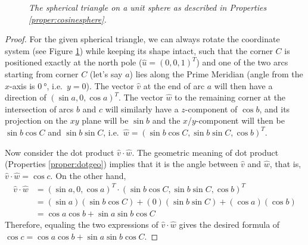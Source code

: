\begin{figure}[ht!]
\caption{\textit{The spherical triangle on a unit sphere as described in Properties \ref{proper:cosinesphere}.}}
\label{fig:cosinesphere}
\end{figure}
\begin{proof}
For the given spherical triangle, we can always rotate the coordinate system (see Figure \ref{fig:cosinesphere}) while keeping its shape intact, such that the corner $C$ is positioned exactly at the north pole ($\hat{u} = (0,0,1)^T$) and one of the two arcs starting from corner $C$ (let's say $a$) lies along the Prime Meridian (angle from the $x$-axis is $\SI{0}{\degree}$, i.e.\ $y = 0$). The vector $\hat{v}$ at the end of arc $a$ will then have a direction of $(\sin a, 0, \cos a)^T$. The vector $\hat{w}$ to the remaining corner at the intersection of arcs $b$ and $c$ will similarly have a $z$-component of $\cos b$, and its projection on the $xy$ plane will be $\sin b$ and the $x$/$y$-component will then be $\sin b \cos C$ and $\sin b \sin C$, i.e.\ $\hat{w} = (\sin b \cos C, \sin b \sin C, \cos b)^T$. \par
Now consider the dot product $\hat{v} \cdot \hat{w}$. The geometric meaning of dot product (Properties \ref{proper:dotgeo}) implies that it is the angle between $\hat{v}$ and $\hat{w}$, that is, $\hat{v} \cdot \hat{w} \allowbreak = \cos c$. On the other hand,
\begin{align*}
\hat{v} \cdot \hat{w} &= (\sin a, 0, \cos a)^T \cdot (\sin b \cos C, \sin b \sin C, \cos b)^T \\
&= (\sin a) (\sin b \cos C) + (0) (\sin b \sin C) + (\cos a) (\cos b) \\
&= \cos a \cos b + \sin a \sin b \cos C 
\end{align*}
Therefore, equaling the two expressions of $\hat{v} \cdot \hat{w}$ gives the desired formula of $\cos c = \cos a \cos b + \sin a \sin b \cos C$.
\end{proof}
